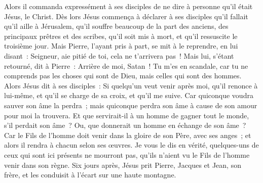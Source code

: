 \begin{multicols}{2}
Alors il commanda expressément à ses disciples de ne dire à personne qu'il était Jésus, le Christ.
Dès lors Jésus commença à déclarer à ses disciples qu'il fallait qu'il aille à Jérusalem, qu'il souffre beaucoup de la part des anciens, des principaux prêtres et des scribes, qu'il soit mis à mort, et qu'il ressuscite le troisième jour.
Mais Pierre, l'ayant pris à part, se mit à le reprendre, en lui disant~: Seigneur, aie pitié de toi, cela ne t'arrivera pas~!
Mais lui, s'étant retourné, dit à Pierre~: Arrière de moi, Satan~! Tu m'es en scandale, car tu ne comprends pas les choses qui sont de Dieu, mais celles qui sont des hommes.
Alors Jésus dit à ses disciples~: Si quelqu'un veut venir après moi, qu'il renonce à lui-même, et qu'il se charge de sa croix, et qu'il me suive.
Car quiconque voudra sauver son âme la perdra~; mais quiconque perdra son âme à cause de son amour pour moi la trouvera.
Et que servirait-il à un homme de gagner tout le monde, s'il perdait son âme~? Ou, que donnerait un homme en échange de son âme~?
Car le Fils de l'homme doit venir dans la gloire de son Père, avec ses anges~; et alors il rendra à chacun selon ses œuvres.
Je vous le dis en vérité, quelques-uns de ceux qui sont ici présents ne mourront pas, qu'ils n'aient vu le Fils de l'homme venir dans son règne.
\VerseOne{}Six jours après, Jésus prit Pierre, Jacques et Jean, son frère, et les conduisit à l'écart sur une haute montagne.

\end{multicols}
